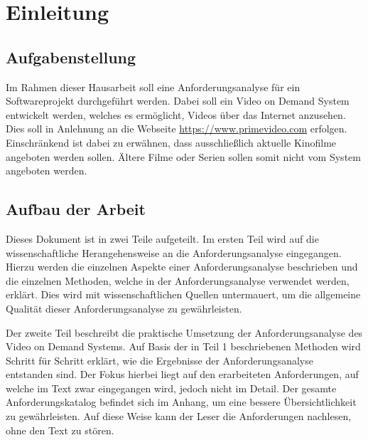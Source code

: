 \section{Einleitung}
\subsection{Aufgabenstellung}
Im Rahmen dieser Hausarbeit soll eine Anforderungsanalyse für ein Softwareprojekt durchgeführt werden.
Dabei soll ein Video on Demand System entwickelt werden, welches es ermöglicht, Videos über das Internet anzusehen.
Dies soll in Anlehnung an die Webseite \url{https://www.primevideo.com} erfolgen.
Einschränkend ist dabei zu erwähnen, dass ausschließlich aktuelle Kinofilme angeboten werden sollen.
Ältere Filme oder Serien sollen somit nicht vom System angeboten werden.

\subsection{Aufbau der Arbeit}
Dieses Dokument ist in zwei Teile aufgeteilt.
Im ersten Teil wird auf die wissenschaftliche Herangehensweise an die Anforderungsanalyse eingegangen.
Hierzu werden die einzelnen Aspekte einer Anforderungsanalyse beschrieben und die einzelnen Methoden, welche in der Anforderungsanalyse verwendet werden, erklärt.
Dies wird mit wissenschaftlichen Quellen untermauert, um die allgemeine Qualität dieser Anforderungsanalyse zu gewährleisten.

Der zweite Teil beschreibt die praktische Umsetzung der Anforderungsanalyse des Video on Demand Systems.
Auf Basis der in Teil 1 beschriebenen Methoden wird Schritt für Schritt erklärt, wie die Ergebnisse der Anforderungsanalyse entstanden sind.
Der Fokus hierbei liegt auf den erarbeiteten Anforderungen, auf welche im Text zwar eingegangen wird, jedoch nicht im Detail.
Der gesamte Anforderungskatalog befindet sich im Anhang, um eine bessere Übersichtlichkeit zu gewährleisten.
Auf diese Weise kann der Leser die Anforderungen nachlesen, ohne den Text zu stören.
